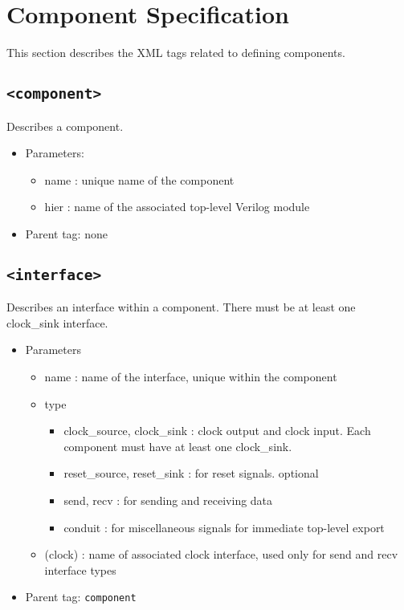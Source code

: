 \documentclass{article}
\begin{document}
\section{Component Specification}

This section describes the XML tags related to defining components.

\subsection{\texttt{<component>}}

Describes a component.

\begin{itemize}
\item{Parameters:}
\begin{itemize}
\item{name : unique name of the component}
\item{hier : name of the associated top-level Verilog module}
\end{itemize}
\item{Parent tag: none}
\end{itemize}

\subsection{\texttt{<interface>}}

Describes an interface within a component. There must be at least one clock\_sink interface.

\begin{itemize}
	\item{Parameters}
	\begin{itemize}
		\item{name : name of the interface, unique within the component}
		\item{type}
		\begin{itemize}
			\item{clock\_source, clock\_sink : clock output and clock input. Each component must have at least one clock\_sink.}
			\item{reset\_source, reset\_sink : for reset signals. optional}
			\item{send, recv : for sending and receiving data}
			\item{conduit : for miscellaneous signals for immediate top-level export}
		\end{itemize}
		\item{(clock) : name of associated clock interface, used only for send and recv interface types}
	\end{itemize}
	\item{Parent tag: \texttt{component}}
\end{itemize}
\end{document}
